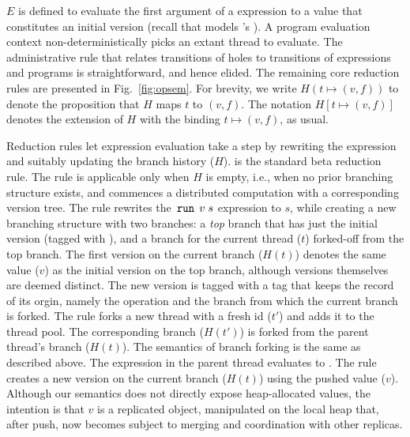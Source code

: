 $E$ is defined to evaluate the first argument of a  expression
to a value that constitutes an initial version (recall that 
models \name's ). A program evaluation
context non-deterministically picks an extant thread to evaluate. The
administrative rule that relates transitions of holes to transitions
of expressions and programs is straightforward, and hence elided. The
remaining core reduction rules are presented in
Fig.~\ref{fig:opsem}. For brevity, we write $H(t\mapsto (v,f))$ to
denote the proposition that $H$ maps $t$ to $(v,f)$. The notation $H[t
  \mapsto (v,f)]$ denotes the extension of $H$ with the binding $t
\mapsto (v,f)$, as usual.

Reduction rules let expression evaluation take a step by rewriting the
expression and suitably updating the branch history ($H$).
 is the standard beta reduction rule.  The
 rule is applicable only when $H$ is empty, i.e.,
when no prior branching structure exists, and commences a distributed
computation with a corresponding version tree. The rule rewrites the
$\,{\tt run}\,\;v\;s$ expression to $s$, while creating a new branching
structure with two branches: a \emph{top} branch that has just the
initial version (tagged with ), and a branch for the current
thread ($t$) forked-off from the top branch.  The first version on the
current branch ($H(t)$) denotes the same value ($v$) as the initial
version on the top branch, although versions themselves are deemed
distinct. The new version is tagged with a  tag that keeps the
record of its orgin, namely the  operation and the branch from
which the current branch is forked. The  rule forks
a new thread with a fresh id ($t'$) and adds it to the thread pool.
The corresponding branch ($H(t')$) is forked from the parent thread's
branch ($H(t)$). The semantics of branch forking is the same as
described above. The  expression in the parent thread
evaluates to \C{()}. The  rule creates a new version
on the current branch ($H(t)$) using the pushed value ($v$).  Although
our semantics does not directly expose heap-allocated values, the
intention is that $v$ is a replicated object, manipulated on the local
heap that, after push, now becomes subject to merging and coordination
with other replicas.

